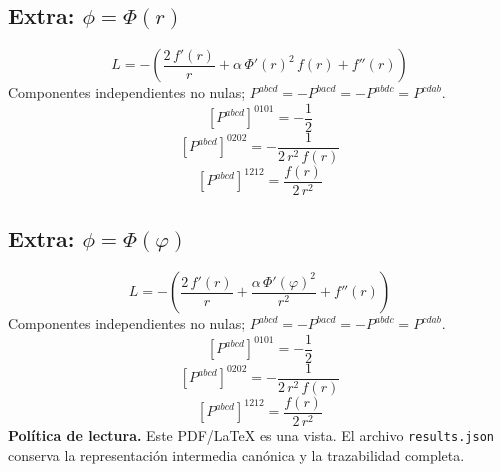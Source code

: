 \documentclass[11pt]{article}
\begin{document}
\subsection*{Extra: $\phi=\Phi\!\left(r\right)$}
\begin{dmath*}[breakdepth={5}]
L=-\left(\frac{2\,f'\!\left(r\right)}{r} + \alpha\,{\Phi'\!\left(r\right)}^{2}\,f\!\left(r\right) + f''\!\left(r\right)\right)
\end{dmath*}
Componentes independientes no nulas; $P^{abcd}=-P^{bacd}=-P^{abdc}=P^{cdab}$.
\begin{dmath*}[breakdepth={5}]
\left[P^{abcd}\right]^{0101}=-\frac{1}{2}
\end{dmath*}
\begin{dmath*}[breakdepth={5}]
\left[P^{abcd}\right]^{0202}=-\frac{1}{2\,{r}^{2}\,f\!\left(r\right)}
\end{dmath*}
\begin{dmath*}[breakdepth={5}]
\left[P^{abcd}\right]^{1212}=\frac{f\!\left(r\right)}{2\,{r}^{2}}
\end{dmath*}
\subsection*{Extra: $\phi=\Phi\!\left(\varphi\right)$}
\begin{dmath*}[breakdepth={5}]
L=-\left(\frac{2\,f'\!\left(r\right)}{r} + \frac{\alpha\,{\Phi'\!\left(\varphi\right)}^{2}}{{r}^{2}} + f''\!\left(r\right)\right)
\end{dmath*}
Componentes independientes no nulas; $P^{abcd}=-P^{bacd}=-P^{abdc}=P^{cdab}$.
\begin{dmath*}[breakdepth={5}]
\left[P^{abcd}\right]^{0101}=-\frac{1}{2}
\end{dmath*}
\begin{dmath*}[breakdepth={5}]
\left[P^{abcd}\right]^{0202}=-\frac{1}{2\,{r}^{2}\,f\!\left(r\right)}
\end{dmath*}
\begin{dmath*}[breakdepth={5}]
\left[P^{abcd}\right]^{1212}=\frac{f\!\left(r\right)}{2\,{r}^{2}}
\end{dmath*}
\bigskip\noindent\textbf{Política de lectura.} Este PDF/LaTeX es una vista. El archivo \texttt{results.json} conserva la representación intermedia canónica y la trazabilidad completa.
\end{document}
